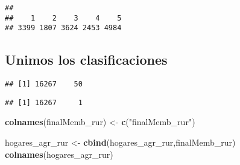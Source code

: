 \documentclass[11pt,]{article}
\newenvironment{Shaded}{\begin{snugshade}}{\end{snugshade}}
\newcommand{\KeywordTok}[1]{\textcolor[rgb]{0.13,0.29,0.53}{\textbf{#1}}}
\newcommand{\DecValTok}[1]{\textcolor[rgb]{0.00,0.00,0.81}{#1}}
\newcommand{\StringTok}[1]{\textcolor[rgb]{0.31,0.60,0.02}{#1}}
\newcommand{\OperatorTok}[1]{\textcolor[rgb]{0.81,0.36,0.00}{\textbf{#1}}}
\newcommand{\NormalTok}[1]{#1}
\begin{document}
\begin{verbatim}
## 
##    1    2    3    4    5 
## 3399 1807 3624 2453 4984
\end{verbatim}

\subsection{Unimos los
clasificaciones}\label{unimos-los-clasificaciones}

\begin{Shaded}
\end{Shaded}

\begin{verbatim}
## [1] 16267    50
\end{verbatim}

\begin{Shaded}
\end{Shaded}

\begin{verbatim}
## [1] 16267     1
\end{verbatim}

\begin{Shaded}
\begin{Highlighting}[]
\KeywordTok{colnames}\NormalTok{(finalMemb_rur) <-}\StringTok{ }\KeywordTok{c}\NormalTok{(}\StringTok{"finalMemb_rur"}\NormalTok{) }

\NormalTok{hogares_agr_rur <-}\StringTok{ }\KeywordTok{cbind}\NormalTok{(hogares_agr_rur,finalMemb_rur)}
\KeywordTok{colnames}\NormalTok{(hogares_agr_rur)  }
\end{Highlighting}
\end{Shaded}
\end{document}
